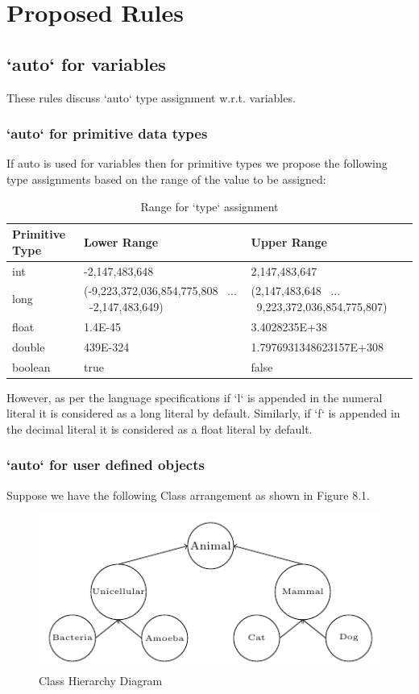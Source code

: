 \section{Proposed Rules}
\subsection{`auto` for variables}
These rules discuss `auto` type assignment w.r.t. variables. 
\subsubsection{`auto` for primitive data types}
If auto is used for variables then for primitive types we propose the following type assignments based on the range of the value to be assigned: 
\begin{table}[h]
\centering
\caption{Range for `type` assignment}
\begin{tabular}{|p{2cm}|p{5cm}|p{5cm}|}
\hline
\textbf{Primitive Type} & \textbf{Lower Range}  & \textbf{Upper Range}\\
\hline
int 			& 	-2,147,483,648		&	2,147,483,647\\
long			&	(-9,223,372,036,854,775,808 \ ... \ -2,147,483,649)	& (2,147,483,648 \ ... \ 9,223,372,036,854,775,807)\\
float			& 	1.4E-45				& 3.4028235E+38\\
double  		&	439E-324			& 1.7976931348623157E+308\\
boolean 		& true	& false\\
\hline
\end{tabular}
\end{table}
However, as per the language specifications if `l` is appended in the numeral literal it is considered as a long literal by default. Similarly, if `f` is appended in the decimal literal it is considered as a float literal by default. 
\subsubsection{`auto` for user defined objects}
Suppose we have the following Class arrangement as shown in Figure 8.1.

\begin{figure}
\centering
\includegraphics[width = 15cm]{diagram2.pdf}
\caption{Class Hierarchy Diagram\label{classhierarchy}}
\end{figure}

